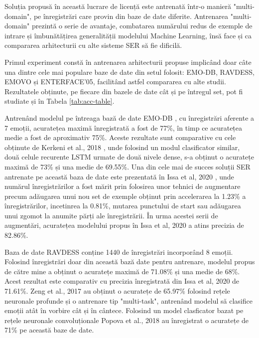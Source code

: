 \documentclass[a4paper,12pt]{book}
\begin{document}
		 Soluția propusă în această lucrare de licență este antrenată într-o manieră "multi-domain", pe înregistrări care provin din baze de date diferite. Antrenarea "multi-domain" prezintă o serie de avantaje, combatarea numărului redus de exemple de intrare și îmbunătățirea generalității modelului Machine Learning, însă face și ca compararea arhitecturii cu alte sisteme SER să fie dificilă. \par
		 Primul experiment constă în antrenarea arhitecturii propuse implicând doar câte una dintre cele mai populare baze de date din setul folosit: EMO-DB, RAVDESS, EMOVO și ENTERFACE'05, facilitând astfel compararea cu alte studii. Rezultatele obținute, pe fiecare din bazele de date cât și pe întregul set, pot fi studiate și în Tabela \ref{tab:acc-table}.
		  \par
		 Antrenând modelul pe întreaga bază de date EMO-DB \cite{emodb}, cu înregistrări aferente a 7 emoții, acuratețea maximă înregistrată a fost de 77\%, în timp ce acuratețea medie a fost de aproximativ 75\%. Aceste rezultate sunt comparative cu cele obținute de Kerkeni et al., 2018 \cite{comp1}, unde folosind un modul clasificator similar, două celule recurente LSTM urmate de două nivele dense, s-a obținut o acuratețe maximă de 73\% și una medie de 69.55\%. Una din cele mai de succes soluții SER antrenate pe această baza de date este prezentată în Issa et al, 2020 \cite{comp2}, unde numărul înregistrărilor a fost mărit prin folosirea unor tehnici de augmentare precum adăugarea unui nou set de exemple obținut prin accelerarea la 1.23\% a înregistrărilor, incetinrea la 0.81\%, mutarea punctului de start sau adăugarea unui zgomot la anumite părți ale înregistrării. În urma acestei serii de augmentări, acuratețea modelului propus în Issa et al, 2020 \cite{comp2} a atins precizia de 82.86\%.\par
		 Baza de date RAVDESS \cite{ravdess} conține 1440 de înregistrări incorporând 8 emoții. Folosind înregistrări doar din această bază date pentru antrenare, modelul propus de către mine a obținut o acuratețe maximă de 71.08\% și una medie de 68\%. Acest rezultat este comparativ cu precizia înregistrată din Issa et al, 2020 \cite{comp2} de 71.61\%. Zeng et al., 2017 \cite{comp3} au obținut o acuratețe de 65.97\% folosind rețele neuronale profunde și o antrenare tip "multi-task", antrenând modelul să clasifice emoții atât în vorbire cât și în cântece. Folosind un model clasficator bazat pe rețele neuronale convoluționale Popova et al., 2018 \cite{comp4} au înregistrat o acuratețe de 71\% pe această baze de date. \par
\end{document}
